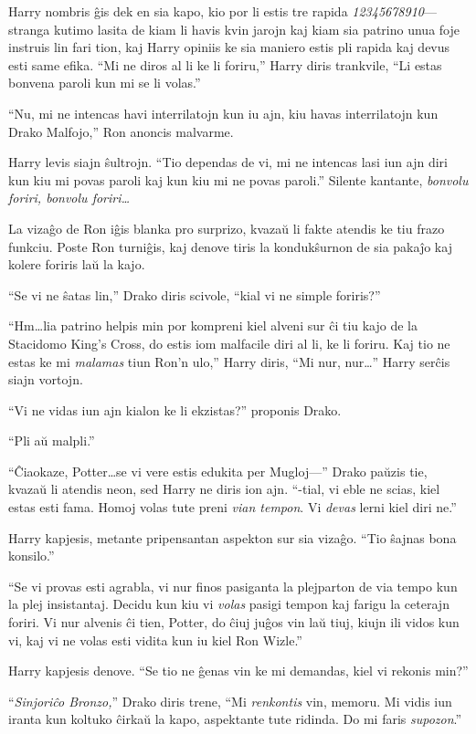 Harry nombris ĝis dek en sia kapo, kio por li estis tre rapida
\emph{12345678910}—stranga kutimo lasita de kiam li havis kvin jarojn
kaj kiam sia patrino unua foje instruis lin fari tion, kaj Harry
opiniis ke sia maniero estis pli rapida kaj devus esti same
efika. ``Mi ne diros al li ke li foriru,'' Harry diris trankvile, ``Li
estas bonvena paroli kun mi se li volas.''

``Nu, mi ne intencas havi interrilatojn kun iu ajn, kiu havas
interrilatojn kun Drako Malfojo,'' Ron anoncis malvarme.

Harry levis siajn ŝultrojn. ``Tio dependas de vi, mi ne intencas lasi
iun ajn diri kun kiu mi povas paroli kaj kun kiu mi ne povas paroli.''
Silente kantante, \emph{bonvolu foriri, bonvolu foriri\ldots}

La vizaĝo de Ron iĝis blanka pro surprizo, kvazaŭ li fakte atendis ke
tiu frazo funkciu. Poste Ron turniĝis, kaj denove tiris la
kondukŝurnon de sia pakaĵo kaj kolere foriris laŭ la kajo.

``Se vi ne ŝatas lin,'' Drako diris scivole, ``kial vi ne simple
foriris?''

``Hm\ldots lia patrino helpis min por kompreni kiel alveni sur ĉi tiu
kajo de la Stacidomo King's Cross, do estis iom malfacile diri al li,
ke li foriru. Kaj tio ne estas ke mi \emph{malamas} tiun Ron'n ulo,''
Harry diris, ``Mi nur, nur\ldots'' Harry serĉis siajn vortojn.

``Vi ne vidas iun ajn kialon ke li ekzistas?'' proponis Drako.

``Pli aŭ malpli.''

``Ĉiaokaze, Potter\ldots se vi vere estis edukita per Mugloj—'' Drako
paŭzis tie, kvazaŭ li atendis neon, sed Harry ne diris ion
ajn. ``-tial, vi eble ne scias, kiel estas esti fama. Homoj volas
tute preni \emph{vian tempon}. Vi \emph{devas} lerni kiel diri ne.''

Harry kapjesis, metante pripensantan aspekton sur sia vizaĝo. ``Tio
ŝajnas bona konsilo.''

``Se vi provas esti agrabla, vi nur finos pasiganta la plejparton de
via tempo kun la plej insistantaj. Decidu kun kiu vi \emph{volas}
pasigi tempon kaj farigu la ceterajn foriri. Vi nur alvenis ĉi tien,
Potter, do ĉiuj juĝos vin laŭ tiuj, kiujn ili vidos kun vi, kaj vi ne
volas esti vidita kun iu kiel Ron Wizle.''

Harry kapjesis denove. ``Se tio ne ĝenas vin ke mi demandas, kiel vi
rekonis min?''

``\emph{Sinjoriĉo Bronzo,}'' Drako diris trene, ``Mi \emph{renkontis}
vin, memoru. Mi vidis iun iranta kun koltuko ĉirkaŭ la kapo,
aspektante tute ridinda. Do mi faris \emph{supozon}.''

